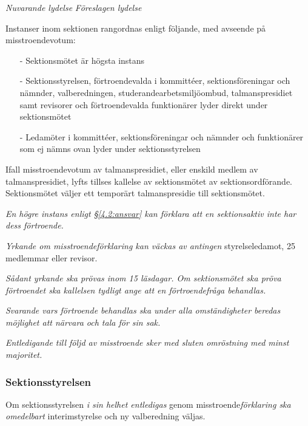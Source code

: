 \documentclass{article}
\newenvironment{lydelse}
    {\begin{paracol}{2}%
        \emph{Nuvarande lydelse}%
        \switchcolumn%
        \emph{Föreslagen lydelse}%
    \end{paracol}%
    \begin{enumerate}[label=\thesubsection.\arabic*]%
    \begin{paracol}{2}%
    }{\end{paracol}\end{enumerate}}
\begin{document}
\begin{lydelse}
	  \item Instanser inom sektionen rangordnas enligt följande, med avseende på misstroendevotum:
  		\begin{itemize}
  			\item[-] Sektionsmötet är högsta instans
  			\item[-] Sektionsstyrelsen, förtroendevalda i kommittéer, sektionsföreningar och nämnder, valberedningen, studerandearbetsmiljöombud, talmanspresidiet samt revisorer och förtroendevalda funktionärer lyder direkt under sektionsmötet
  			\item[-] Ledamöter i kommittéer, sektionsföreningar och nämnder och funktionärer som ej nämns ovan lyder under sektionsstyrelsen
  		\end{itemize}
	
  	\item Ifall misstroendevotum av talmanspresidiet, eller enskild medlem av talmanspresidiet, lyfts tillses kallelse av sektionsmötet av sektionsordförande. Sektionsmötet väljer ett temporärt talmanspresidie till sektionsmötet.

  \switchcolumn
    \setcounter{subsection}{4}  
    \item \emph{En högre instans enligt \S\ref{4.2:ansvar} kan förklara att en
      sektionsaktiv inte har dess förtroende.}

    \item \emph{Yrkande om misstroendeförklaring kan väckas av antingen}
      styrelseledamot, 25 medlemmar eller revisor.

    \item \emph{Sådant yrkande ska prövas inom 15 läsdagar. Om sektionsmötet ska
      pröva förtroendet ska kallelsen tydligt ange att en förtroendefråga behandlas.}

    \item \emph{Svarande vars förtroende behandlas ska under alla omständigheter
      beredas möjlighet att närvara och tala för sin sak.}

    \item \emph{Entledigande till följd av misstroende sker med sluten omröstning med minst 
        majoritet.}
      
    \subsubsection*{Sektionsstyrelsen}
    \item Om sektionsstyrelsen \emph{i sin helhet entledigas} genom
      misstroende\emph{förklaring ska omedelbart} interimstyrelse och ny
      valberedning väljas.


\end{lydelse}
\end{document}
